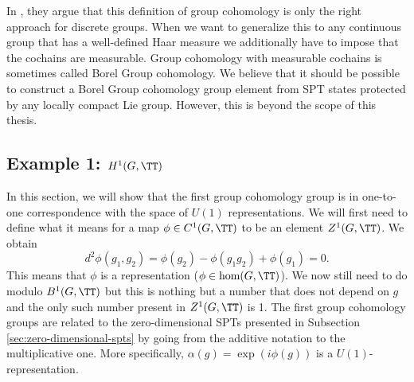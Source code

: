 \begin{remark}
	In \cite{Chen_2013}, they argue that this definition of group cohomology is only the right approach for discrete groups. When we want to generalize this to any continuous group that has a well-defined Haar measure we additionally have to impose that the cochains are measurable. Group cohomology with measurable cochains is sometimes called Borel Group cohomology. We believe that it should be possible to construct a Borel Group cohomology group element from SPT states protected by any locally compact Lie group. However, this is beyond the scope of this thesis.
\end{remark}
\subsection{Example 1: \texorpdfstring{$H^1(G,\TT)$}{H1}}\label{sec:example-1-h1gtt}
In this section, we will show that the first group cohomology group is in one-to-one correspondence with the space of $U(1)$ representations. We will first need to define what it means for a map $\phi\in C^1(G, \TT)$ to be an element $Z^1(G,\TT)$. We obtain
\begin{equation}
d^2\phi(g_1,g_2)=\phi(g_2)-\phi(g_1g_2)+\phi(g_1)=0.
\end{equation}
This means that $\phi$ is a representation ($\phi\in\hom(G,\TT)$). We now still need to do modulo $B^1(G,\TT)$ but this is nothing but a number that does not depend on $g$ and the only such number present in $Z^1(G,\TT)$ is 1. The first group cohomology groups are related to the zero-dimensional SPTs presented in Subsection \ref{sec:zero-dimensional-spts} by going from the additive notation to the multiplicative one. More specifically, $\alpha(g)=\exp(i\phi(g))$ is a $U(1)$-representation.
